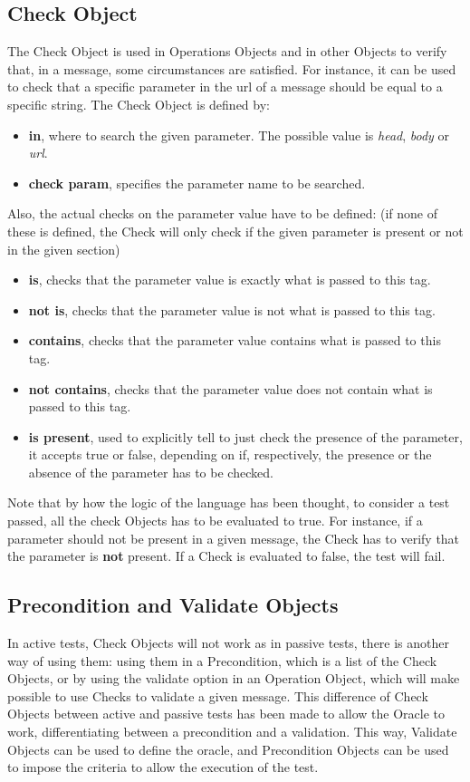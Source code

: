\subsection{Check Object}
The Check Object is used in Operations Objects and in other Objects to verify that, in a message, some circumstances are satisfied. For instance, it can be used to check that a specific parameter in the url of a message should be equal to a specific string.
The Check Object is defined by:
\begin{itemize}
    \item \textbf{in}, where to search the given parameter. The possible value is \textit{head}, \textit{body} or \textit{url}.
    \item \textbf{check param}, specifies the parameter name to be searched.
\end{itemize}
Also, the actual checks on the parameter value have to be defined: (if none of these is defined, the Check will only check if the given parameter is present or not in the given section)
\begin{itemize}
    \item \textbf{is}, checks that the parameter value is exactly what is passed to this tag.
    \item \textbf{not is}, checks that the parameter value is not what is passed to this tag.
    \item \textbf{contains}, checks that the parameter value contains what is passed to this tag.
    \item \textbf{not contains}, checks that the parameter value does not contain what is passed to this tag.
    \item \textbf{is present}, used to explicitly tell to just check the presence of the parameter, it accepts true or false, depending on if, respectively, the presence or the absence of the parameter has to be checked.
\end{itemize}

Note that by how the logic of the language has been thought, to consider a test passed, all the check Objects has to be evaluated to true. For instance, if a parameter should not be present in a given message, the Check has to verify that the parameter is \textbf{not} present. If a Check is evaluated to false, the test will fail.

\subsection{Precondition and Validate Objects}
In active tests, Check Objects will not work as in passive tests, there is another way of using them: using them in a Precondition, which is a list of the Check Objects, or by using the validate option in an Operation Object, which will make possible to use Checks to validate a given message. This difference of Check Objects between active and passive tests has been made to allow the Oracle to work, differentiating between a precondition and a validation. This way, Validate Objects can be used to define the oracle, and Precondition Objects can be used to impose the criteria to allow the execution of the test.
